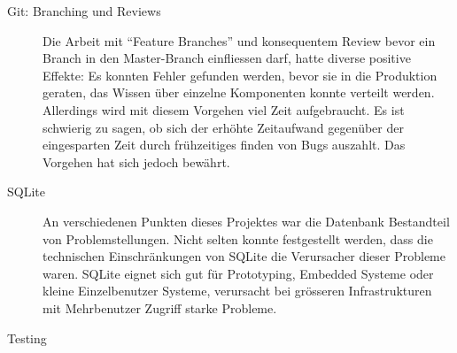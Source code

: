 \begin{description}
	\item[Git: Branching und Reviews] Die Arbeit mit \enquote{Feature Branches} und
	konsequentem Review bevor ein Branch in den Master-Branch einfliessen darf,
	hatte diverse positive Effekte: Es konnten Fehler gefunden werden, bevor sie in
	die Produktion geraten, das Wissen über einzelne Komponenten konnte verteilt
	werden. Allerdings wird mit diesem Vorgehen viel Zeit aufgebraucht. Es ist schwierig
	zu sagen, ob sich der erhöhte Zeitaufwand gegenüber der eingesparten Zeit
	durch frühzeitiges finden von Bugs auszahlt. Das Vorgehen hat sich jedoch
	bewährt.
	
	\item[SQLite] An verschiedenen Punkten dieses Projektes war die Datenbank
	Bestandteil von Problemstellungen. Nicht selten konnte festgestellt werden,
	dass die technischen Einschränkungen von SQLite die Verursacher dieser Probleme
	waren. SQLite eignet sich gut für Prototyping, Embedded Systeme oder kleine
	Einzelbenutzer Systeme, verursacht bei grösseren Infrastrukturen mit
	Mehrbenutzer Zugriff starke Probleme.
	
	\item[Testing] 
	
\end{description}

